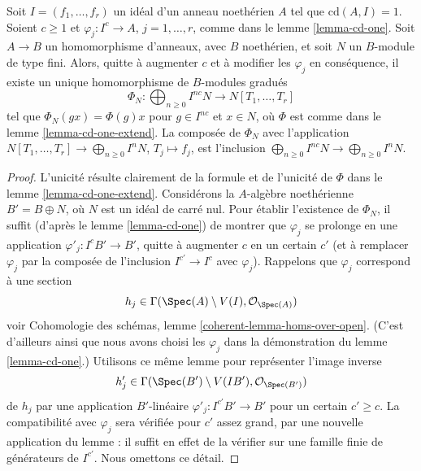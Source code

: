 \begin{lemma}
\label{lemma-cd-one-extend-to-module}
Soit $I = (f_1, \ldots, f_r)$ un idéal d'un anneau noethérien $A$
tel que $\text{cd}(A, I) = 1$. Soient $c \geq 1$ et $\varphi_j : I^c \to A$,
$j = 1, \ldots, r$, comme dans le lemme \ref{lemma-cd-one}.
Soit $A \to B$ un homomorphisme d'anneaux, avec $B$ noethérien, et soit $N$
un $B$-module de type fini. Alors, quitte à augmenter $c$
et à modifier les $\varphi_j$ en conséquence, il existe un unique
homomorphisme de $B$-modules gradués
$$
\Phi_N : \bigoplus\nolimits_{n \geq 0} I^{nc}N \to N[T_1, \ldots, T_r]
$$
tel que $\Phi_N(g x) = \Phi(g) x$ pour $g \in I^{nc}$ et $x \in N$,
où $\Phi$ est comme dans le lemme \ref{lemma-cd-one-extend}.
La composée de $\Phi_N$ avec l'application
$N[T_1, \ldots, T_r] \to \bigoplus_{n \geq 0} I^nN$,
$T_j \mapsto f_j$, est l'inclusion
$\bigoplus_{n \geq 0} I^{nc}N \to \bigoplus_{n \geq 0} I^nN$.
\end{lemma}

\begin{proof}
L'unicité résulte clairement de la formule et de l'unicité de $\Phi$ dans le
lemme \ref{lemma-cd-one-extend}. Considérons la $A$-algèbre noethérienne
$B' = B \oplus N$, où $N$ est un idéal de carré nul. Pour établir
l'existence de $\Phi_N$, il suffit
(d'après le lemme \ref{lemma-cd-one}) de montrer que $\varphi_j$ se prolonge en
une application $\varphi'_j : I^cB' \to B'$, quitte à augmenter $c$
en un certain $c'$ (et à remplacer $\varphi_j$ par la composée de l'inclusion
$I^{c'} \to I^c$ avec $\varphi_j$). Rappelons que $\varphi_j$ correspond à une
section
$$
h_j \in \Gamma(\Spec(A) \setminus V(I), \mathcal{O}_{\Spec(A)})
$$
voir Cohomologie des schémas, lemme \ref{coherent-lemma-homs-over-open}.
(C'est d'ailleurs ainsi que nous avons choisi les $\varphi_j$ dans la démonstration du
lemme \ref{lemma-cd-one}.) Utilisons ce même lemme pour représenter l'image inverse
$$
h'_j \in \Gamma(\Spec(B') \setminus V(IB'), \mathcal{O}_{\Spec(B')})
$$
de $h_j$ par une application $B'$-linéaire
$\varphi'_j : I^{c'}B' \to B'$ pour un certain $c' \geq c$.
La compatibilité avec $\varphi_j$ sera vérifiée pour $c'$
assez grand, par une nouvelle application du lemme :
il suffit en effet de la vérifier sur une famille finie de générateurs de $I^{c'}$.
Nous omettons ce détail.
\end{proof}

